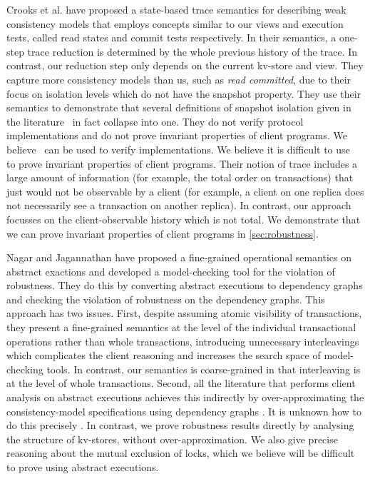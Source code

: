 


Crooks et al. \citet{seebelieve} have proposed a state-based trace
semantics for describing weak consistency models that employs concepts
similar to our views and execution tests, called read states and
commit tests respectively.  In their semantics, a one-step trace
reduction is determined by the whole previous history of the trace.
In contrast, our reduction step only depends on the current kv-store
and view.  They capture more consistency models than us, such as {\em
  read committed}, due to their focus on isolation levels which do not
have the snapshot property. They use their semantics to 
demonstrate that 
several definitions of snapshot isolation  given in the
literature~\cite{citations} in fact collapse into one.  They do not verify
protocol implementations and do not prove invariant properties of
client programs.  We believe~\cite{seebelieve} can be used to verify
implementations. We believe it is difficult to use~\cite{seebelieve}
to prove invariant properties of client programs.  Their notion of
trace includes a large amount of information (for example, the total
order on transactions) that just would not be observable by a
client (for example, a client on one replica does not necessarily see
a transaction on another replica).
In contrast, our  approach focusses on the client-observable history
which is not total.
We demonstrate  that we can 
prove invariant properties of
client programs in \cref{sec:robustness}. 



Nagar and Jagannathan \cite{sureshConcur} have proposed a fine-grained operational semantics on abstract exactions 
and developed a model-checking tool for the violation of robustness. 
They do this by converting abstract executions to
dependency graphs and checking the violation of robustness on the
dependency graphs. This approach has two issues. First, despite 
assuming atomic visibility of transactions, they present a fine-grained
semantics at the level of the individual transactional operations
rather than whole transactions, introducing unnecessary interleavings
which complicates the client reasoning and increases  the
search space of model-checking tools. 
In contrast, our semantics is coarse-grained in that interleaving is at the level of whole
transactions. 
Second, all the literature that performs client analysis
on abstract executions achieves this indirectly by over-approximating
the consistency-model specifications using dependency graphs
\cite{giovanni_concur16,SIanalysis,psi-chopping,laws,sureshConcur}. 
It is  unknown how to do this precisely \cite{laws}. 
In contrast, we prove robustness results directly by
analysing the structure of kv-stores, without over-approximation. 
We also give precise reasoning about the mutual exclusion of locks,
which we believe will be difficult to prove using abstract executions.


